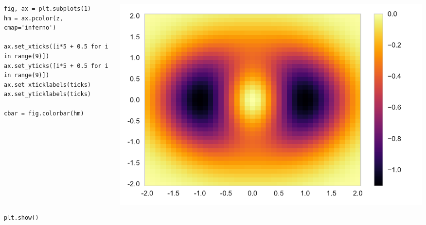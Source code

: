 \documentclass{beamer}
\begin{document}
\begin{frame}[fragile]
\tiny{
\begin{columns}
\begin{column}{0.45\textwidth}
\begin{verbatim}
fig, ax = plt.subplots(1)
hm = ax.pcolor(z, cmap='inferno')

ax.set_xticks([i*5 + 0.5 for i in range(9)])
ax.set_yticks([i*5 + 0.5 for i in range(9)])
ax.set_xticklabels(ticks)
ax.set_yticklabels(ticks)

cbar = fig.colorbar(hm)










plt.show()
\end{verbatim}
\end{column}
\begin{column}{0.55\textwidth}
\includegraphics[width=\textwidth]{../heatmap_4.pdf}
\end{column}
\end{columns}
}
\end{frame}
\end{document}
